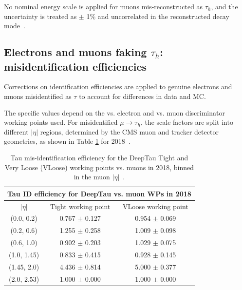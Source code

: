 No nominal energy scale is applied for muons mis-reconstructed as $\tau_{h}$, and the uncertainty is treated as $\pm$ 1\% and uncorrelated in the reconstructed decay mode~\cite{twiki_HiggsToTauTauWorkingLegacyRun2}. 

\subsection{Electrons and muons faking \texorpdfstring{$\tau_{h}$}{tauh}: misidentification efficiencies}
Corrections on identification efficiencies are applied to genuine electrons and muons misidentified as $\tau$ to account for differences in data and MC.

The specific values depend on the vs. electron and vs. muon discriminator working points used. 
For misidentified $\mu \rightarrow \tau_{h}$, the scale factors are split into different $|\eta|$ regions, determined by the CMS muon and tracker detector geometries, as shown in Table \ref{table:tauIDeff_deepTau_vs_muon} for 2018~\cite{twiki_TAU_POG_tauidrecommendationforrun2}.


\begin{table}[ht]
    \centering
    \begin{tabular}{|c|c|c|}
    \hline
    \multicolumn{3}{|c|}{Tau ID efficiency for DeepTau vs. muon WPs in 2018} \\ \hline
    \hline
    $|\eta|$  & Tight working point & VLoose working point \\ \hline
    (0.0, 0.2)     & 0.767 $\pm$ 0.127  & 0.954 $\pm$ 0.069  \\ \hline 
    (0.2, 0.6)     & 1.255 $\pm$ 0.258  & 1.009 $\pm$ 0.098  \\ \hline 
    (0.6, 1.0)     & 0.902 $\pm$ 0.203  & 1.029 $\pm$ 0.075 \\ \hline 
    (1.0, 1.45)    & 0.833 $\pm$ 0.415  & 0.928 $\pm$ 0.145\\ \hline
    (1.45, 2.0)    & 4.436 $\pm$ 0.814   & 5.000 $\pm$ 0.377 \\ \hline
    (2.0, 2.53)    & 1.000 $\pm$ 0.000         & 1.000 $\pm$ 0.000\\ \hline
    \end{tabular}
    \caption[Tau mis-identification efficiency for the DeepTau Tight and Very Loose (VLoose) working points vs. muons in 2018.]{Tau mis-identification efficiency for the DeepTau Tight and Very Loose (VLoose) working points vs. muons in 2018, binned in the muon $|\eta|$~\cite{twiki_TAU_POG_tauidrecommendationforrun2}.}
    \label{table:tauIDeff_deepTau_vs_muon}
\end{table}

